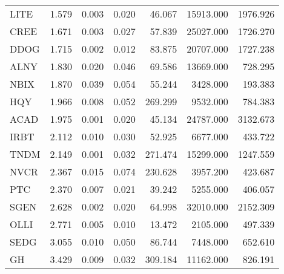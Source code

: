 \begin{table}
\begin{tabular}{lrrrrrr}
LITE   &       1.579 &     0.003 &    0.020 &  46.067 &  15913.000 & 1976.926 \\
CREE   &       1.671 &     0.003 &    0.027 &  57.839 &  25027.000 & 1726.270 \\
DDOG   &       1.715 &     0.002 &    0.012 &  83.875 &  20707.000 & 1727.238 \\
ALNY   &       1.830 &     0.020 &    0.046 &  69.586 &  13669.000 &  728.295 \\
NBIX   &       1.870 &     0.039 &    0.054 &  55.244 &   3428.000 &  193.383 \\
HQY    &       1.966 &     0.008 &    0.052 & 269.299 &   9532.000 &  784.383 \\
ACAD   &       1.975 &     0.001 &    0.020 &  45.134 &  24787.000 & 3132.673 \\
IRBT   &       2.112 &     0.010 &    0.030 &  52.925 &   6677.000 &  433.722 \\
TNDM   &       2.149 &     0.001 &    0.032 & 271.474 &  15299.000 & 1247.559 \\
NVCR   &       2.367 &     0.015 &    0.074 & 230.628 &   3957.200 &  423.687 \\
PTC    &       2.370 &     0.007 &    0.021 &  39.242 &   5255.000 &  406.057 \\
SGEN   &       2.628 &     0.002 &    0.020 &  64.998 &  32010.000 & 2152.309 \\
OLLI   &       2.771 &     0.005 &    0.010 &  13.472 &   2105.000 &  497.339 \\
SEDG   &       3.055 &     0.010 &    0.050 &  86.744 &   7448.000 &  652.610 \\
GH     &       3.429 &     0.009 &    0.032 & 309.184 &  11162.000 &  826.191 \\
\bottomrule
\end{tabular}
\end{table}

